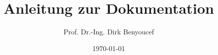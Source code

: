\titlehead{\vspace{-2cm}\texttt{[image: Bilder/Logo/DCSP\_Lab\_v1\_0.pdf]}
           \hfill \texttt{[image: Bilder/Logo/CEE\_4c\_A4.pdf]}\\
            \textsf{Hochschule Furtwangen}\\
            \textsf{Digital Communication \& Signal Processing Lab}\\
            \textsf{Prof. Dr.-Ing. Dirk Benyoucef}}

\subject{\textsf{Projekte, Bachelor-, Master Thesis}}      %
\title{Anleitung zur Dokumentation}
\author{Prof. Dr.-Ing. Dirk Benyoucef}
\date{\today}

\publishers{Version 1.0}
\extratitle{} 